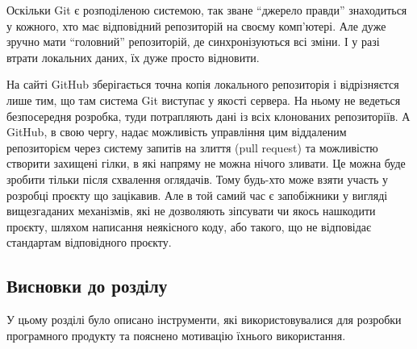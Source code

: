 Оскільки Git є розподіленою системою, так зване ``джерело правди'' знаходиться у кожного,
хто має відповідний репозиторій на своєму комп'ютері. Але дуже зручно мати ``головний''
репозиторій, де синхронізуються всі зміни. І у разі втрати локальних даних, їх дуже просто
відновити.

На сайті GitHub зберігається точна копія локального репозиторія і відрізняєтся лише тим,
що там система Git виступає у якості сервера. На ньому не ведеться безпосередня розробка,
туди потрапляють дані із всіх клонованих репозиторіїв. А GitHub, в свою чергу, надає
можливість управління цим віддаленим репозиторієм через систему запитів на злиття
(pull request) та можливістю створити захищені гілки, в які напряму не можна нічого
зливати. Це можна буде зробити тільки після схвалення оглядачів. Тому будь-хто може
взяти участь у розробці проєкту що зацікавив. Але в той самий час є запобіжники у
вигляді вищезгаданих механізмів, які не дозволяють зіпсувати чи якось нашкодити
проєкту, шляхом написання неякісного коду, або такого, що не відповідає стандартам
відповідного проєкту.

\subsection*{Висновки до розділу }
У цьому розділі було описано інструменти, які використовувалися для розробки
програмного продукту та пояснено мотивацію їхнього використання.
